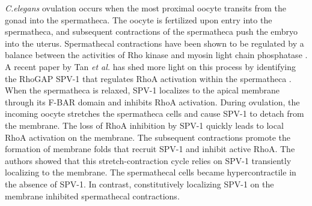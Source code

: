 \documentclass{ucetd}
\begin{document}
\textit{C.elegans} ovulation occurs when the most proximal oocyte transits from the gonad into the spermatheca.  The oocyte is fertilized upon entry into the spermatheca, and subsequent contractions of the spermatheca push the embryo into the uterus.  Spermathecal contractions have been shown to be regulated by a balance between the activities of Rho kinase and myosin light chain phosphatase \cite{Wissmann:1999fq}.  A recent paper by Tan \textit{et al.} has shed more light on this process by identifying the RhoGAP SPV-1 that regulates RhoA activation within the spermatheca \cite{Tan:2015be}.  When the spermatheca is relaxed, SPV-1 localizes to the apical membrane through its F-BAR domain and inhibits RhoA activation.  During ovulation, the incoming oocyte stretches the spermatheca cells and cause SPV-1 to detach from the membrane.  The loss of RhoA inhibition by SPV-1 quickly leads to local RhoA activation on the membrane.  The subsequent contractions promote the formation of membrane folds that recruit SPV-1 and inhibit active RhoA.  The authors showed that this stretch-contraction cycle relies on SPV-1 transiently localizing to the membrane.  The spermathecal cells became hypercontractile in the absence of SPV-1.  In contrast, constitutively localizing SPV-1 on the membrane inhibited spermathecal contractions.
\end{document}
